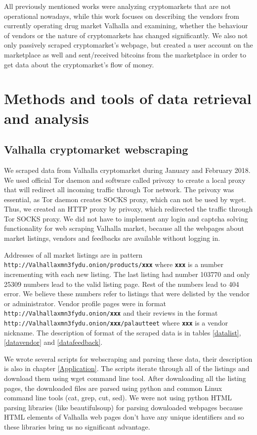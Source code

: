 \documentclass[
  digital, %
  table,   %
  lof,     %
  lot,     %
  oneside
]{fithesis3}
\begin{document}
 All previously mentioned works were analyzing cryptomarkets that are not operational nowadays,
 while this work focuses on describing the vendors from currently operating drug market Valhalla 
 and examining, whether the behaviour of vendors or the nature of cryptomarkets
 has changed significantly. We also not only passively scraped cryptomarket's webpage,
 but created a user account on the marketplace as well and sent/received bitcoins from the marketplace
 in order to get data about the cryptomarket's flow of money.
 
\chapter{Methods and tools of data retrieval and analysis}
\section{Valhalla cryptomarket webscraping}
\label{Valhalla cryptomarket webscraping}
We scraped data from Valhalla cryptomarket
during January and February 2018. 
We used official Tor daemon and software called privoxy to create a local proxy that will redirect all
incoming traffic through Tor network. The privoxy was essential, as Tor daemon creates SOCKS proxy,
which can not be used by wget. Thus, we created an HTTP proxy by privoxy,
which redirected the traffic through Tor SOCKS proxy.
We did not have to implement any login and captcha solving functionality
for web scraping Valhalla market, because all the webpages about market
listings, vendors and feedbacks are available without logging in.

Addresses of all market listings are in pattern\newline
\texttt{http://Valhallaxmn3fydu.onion/products/\textbf{xxx}} where \texttt{\textbf{xxx}}
is a number incrementing with each new listing.
The last listing had number 103770 and only 25309 numbers lead to the valid listing page.
Rest of the numbers lead to 404 error. We believe
these numbers refer to listings that were delisted by the vendor or administrator.
Vendor profile pages were in format \texttt{http://Valhallaxmn3fydu.onion/\textbf{xxx}}
and their reviews in the format
 \texttt{http://Valhallaxmn3fydu.onion/\textbf{xxx}/palautteet} where \texttt{\textbf{xxx}}
is a vendor nickname. The description of format of the scraped data is in tables \ref{datalist}, \ref{datavendor} and \ref{datafeedback}.

We wrote several scripts for webscraping and parsing these data, 
their description is also in chapter \ref{Application}.
The scripts iterate through all of the listings
and download them using wget command line tool.
After downloading all the listing pages,
the downloaded files are parsed using python and common Linux command line tools (cat, grep, cut, sed).
We were not using python HTML parsing libraries (like beautifulsoup) for parsing downloaded
webpages because HTML elements of Valhalla web pages don't have any unique identifiers
and so these libraries bring us no significant advantage.
 
\end{document}
